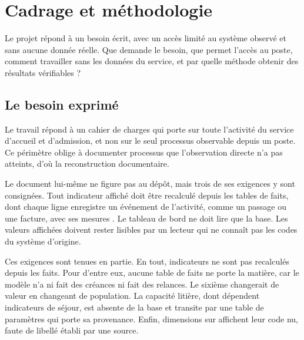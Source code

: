 
\chapter{Cadrage et méthodologie}\label{chap:cadrage}

Le projet répond à un besoin écrit, avec un accès limité au système observé et sans aucune donnée
réelle. Que demande le besoin, que permet l'accès au poste, comment travailler sans les données du
service, et par quelle méthode obtenir des résultats vérifiables ?

\section{Le besoin exprimé}

Le travail répond à un cahier de charges qui porte sur toute l'activité du service d'accueil et
d'admission, et non sur le seul processus observable depuis un poste. Ce périmètre oblige à
documenter  processus que l'observation directe n'a pas atteints,
d'où la reconstruction documentaire.

Le document lui-même ne figure pas au dépôt, mais trois de ses exigences y sont consignées. Tout
indicateur affiché doit être recalculé depuis les tables de faits, dont chaque ligne enregistre un
événement de l'activité, comme un passage ou une facture, avec ses mesures \cite{s52}. Le tableau de
bord ne doit lire que la base. Les valeurs affichées doivent rester lisibles par un lecteur qui ne
connaît pas les codes du système d'origine.

Ces exigences sont tenues en partie. En tout,  indicateurs ne
sont pas recalculés depuis les faits. Pour  d'entre eux, aucune table
de faits ne porte la matière, car le modèle n'a ni fait des créances ni fait des relances. Le sixième
changerait de valeur en changeant de population. La capacité litière, dont dépendent
 indicateurs de séjour, est absente de la base et
transite par une table de paramètres qui porte sa provenance. Enfin,
 dimensions sur  affichent leur code nu, faute
de libellé établi par une source.

